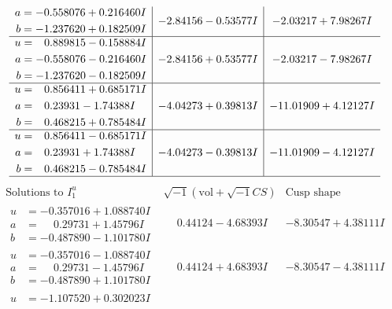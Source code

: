 \documentclass[1p]{elsarticle_modified}
\theoremstyle{definition}
\newcommand{\I}{\sqrt{-1}}
\begin{document}
$$\begin{array}{c|c|c}
\begin{aligned}
a &= -0.558076 + 0.216460 I \\
b &= -1.237620 + 0.182509 I\end{aligned}
 & -2.84156 - 0.53577 I & -2.03217 + 7.98267 I \\ \hline\begin{aligned}
u &= \phantom{-}0.889815 - 0.158884 I \\
a &= -0.558076 - 0.216460 I \\
b &= -1.237620 - 0.182509 I\end{aligned}
 & -2.84156 + 0.53577 I & -2.03217 - 7.98267 I \\ \hline\begin{aligned}
u &= \phantom{-}0.856411 + 0.685171 I \\
a &= \phantom{-}0.23931 - 1.74388 I \\
b &= \phantom{-}0.468215 + 0.785484 I\end{aligned}
 & -4.04273 + 0.39813 I & -11.01909 + 4.12127 I \\ \hline\begin{aligned}
u &= \phantom{-}0.856411 - 0.685171 I \\
a &= \phantom{-}0.23931 + 1.74388 I \\
b &= \phantom{-}0.468215 - 0.785484 I\end{aligned}
 & -4.04273 - 0.39813 I & -11.01909 - 4.12127 I\\
 \hline 
 \end{array}$$\newpage$$\begin{array}{c|c|c}  
\text{Solutions to }I^u_{1}& \I (\text{vol} + \sqrt{-1}CS) & \text{Cusp shape}\\
 \hline 
\begin{aligned}
u &= -0.357016 + 1.088740 I \\
a &= \phantom{-}0.29731 + 1.45796 I \\
b &= -0.487890 - 1.101780 I\end{aligned}
 & \phantom{-}0.44124 - 4.68393 I & -8.30547 + 4.38111 I \\ \hline\begin{aligned}
u &= -0.357016 - 1.088740 I \\
a &= \phantom{-}0.29731 - 1.45796 I \\
b &= -0.487890 + 1.101780 I\end{aligned}
 & \phantom{-}0.44124 + 4.68393 I & -8.30547 - 4.38111 I \\ \hline\begin{aligned}
u &= -1.107520 + 0.302023 I \\

\end{aligned}
\end{array}$$
\end{document}
